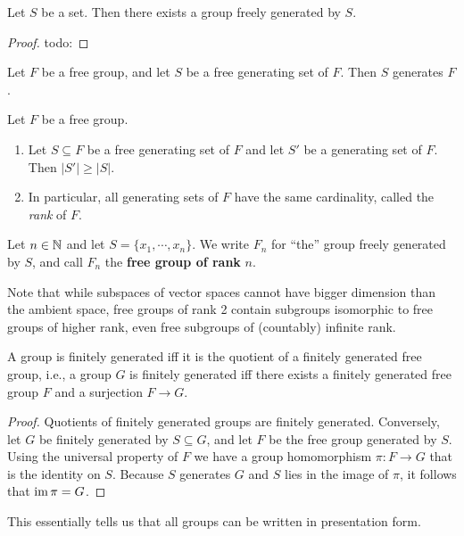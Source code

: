 \begin{theorem}
    Let $S$ be a set. Then there exists a group freely generated by $S$.
\end{theorem}
\begin{proof}
    {\color{red}todo:} 
\end{proof}
\begin{cor}
    Let $F$ be a free group, and let $S$ be a free generating set of $F$. Then $S$ generates  $F$.
\end{cor}
\begin{prop}
    Let $F$ be a free group.
    \begin{enumerate}[label=(\arabic*)]
    \setlength\itemsep{-.2em}
        \item Let $S \subseteq F$ be a free generating set of $F$ and let $S'$ be a generating set of $F$. Then $|S'| \geq |S|$.
        \item In particular, all generating sets of $F$ have the same cardinality, called the \emph{rank} of $F$.
    \end{enumerate}
    \begin{definition}[]
        Let $n \in \mathbb{N}$ and let $S = \{x_1, \cdots ,x_n \} $. We write $F_n $ for ``the'' group freely generated by $S$, and call $F_n $ the \textbf{free group of rank} $n$.
    \end{definition}
\end{prop}
Note that while subspaces of vector spaces cannot have bigger dimension than the ambient space, free groups of rank 2 contain subgroups isomorphic to free groups of higher rank, even free subgroups of (countably) infinite rank. 
\begin{cor}
    A group is finitely generated iff it is the quotient of a finitely generated free group, i.e., a group $G$ is finitely generated iff there exists a finitely generated free group $F$ and a surjection $F \to G$.
\end{cor}
\begin{proof}
    Quotients of finitely generated groups are finitely generated. Conversely, let $G$ be finitely generated by $S \subseteq G$, and let $F$ be the free group generated by $S$. Using the universal property of $F$ we have a group homomorphism $\pi \colon F\to G$ that is the identity on $S$. Because $S$ generates $G$ and $S$ lies in the image of $\pi$, it follows that $\operatorname{im} \pi = G$.
\end{proof}
This essentially tells us that all groups can be written in presentation form.

